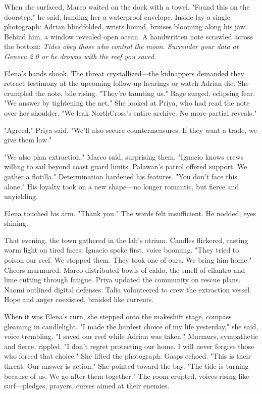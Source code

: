 When she surfaced, Marco waited on the dock with a towel. "Found this on the doorstep," he said, handing her a waterproof envelope. Inside lay a single photograph: Adrian blindfolded, wrists bound, bruises blooming along his jaw. Behind him, a window revealed open ocean. A handwritten note scrawled across the bottom: \textit{Tides obey those who control the moon. Surrender your data at Geneva 2.0 or he drowns with the reef you saved.}\n

Elena's hands shook. The threat crystallized—the kidnappers demanded they retract testimony at the upcoming follow-up hearings or watch Adrian die. She crumpled the note, bile rising. "They're taunting us." Rage surged, eclipsing fear. "We answer by tightening the net." She looked at Priya, who had read the note over her shoulder. "We leak NorthCross's entire archive. No more partial reveals."

"Agreed," Priya said. "We'll also secure countermeasures. If they want a trade, we give them law."

"We also plan extraction," Marco said, surprising them. "Ignacio knows crews willing to sail beyond coast guard limits. Palawan's patrol offered support. We gather a flotilla." Determination hardened his features. "You don't face this alone." His loyalty took on a new shape—no longer romantic, but fierce and unyielding.

Elena touched his arm. "Thank you." The words felt insufficient. He nodded, eyes shining.

That evening, the town gathered in the lab's atrium. Candles flickered, casting warm light on tired faces. Ignacio spoke first, voice booming. "They tried to poison our reef. We stopped them. They took one of ours. We bring him home." Cheers murmured. Marco distributed bowls of caldo, the smell of cilantro and lime cutting through fatigue. Priya updated the community on rescue plans. Naomi outlined digital defenses. Talia volunteered to crew the extraction vessel. Hope and anger coexisted, braided like currents.

When it was Elena's turn, she stepped onto the makeshift stage, compass gleaming in candlelight. "I made the hardest choice of my life yesterday," she said, voice trembling. "I saved our reef while Adrian was taken." Murmurs, sympathetic and fierce, rippled. "I don't regret protecting our home. I will never forgive those who forced that choice." She lifted the photograph. Gasps echoed. "This is their threat. Our answer is action." She pointed toward the bay. "The tide is turning because of us. We go after them together." The room erupted, voices rising like surf—pledges, prayers, curses aimed at their enemies.

